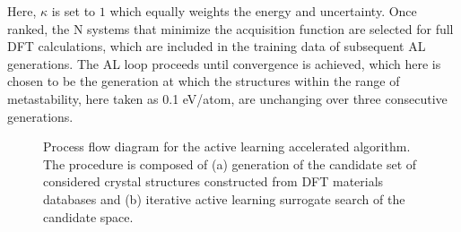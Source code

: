%
Here, $\kappa$ is set to $1$ which equally weights the energy and uncertainty.
Once ranked, the N systems that minimize the acquisition function are selected for full DFT calculations, which are included in the training data of subsequent AL generations.
The AL loop proceeds until convergence is achieved, which here is chosen to be the generation at which the structures within the range of metastability, here taken as 0.1 eV/atom, are unchanging over three consecutive generations.



\begin{figure}[!htb]
\centering
{}
\caption{\label{fig:all_diagram}
Process flow diagram for the active learning accelerated algorithm. The procedure is composed of (a) generation of the candidate set of considered crystal structures constructed from DFT materials databases and (b) iterative active learning surrogate search of the candidate space.
}
\end{figure}



